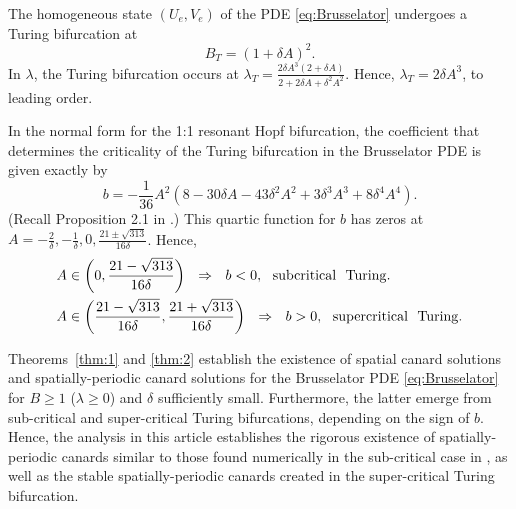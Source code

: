 \documentclass[11pt]{article}
\numberwithin{equation}{section}
\begin{document}
The homogeneous state $(U_e,V_e)$ of the PDE \eqref{eq:Brusselator} undergoes a Turing bifurcation at 
\begin{equation}\label{eq:Brusselator-BT}
B_T = ( 1 + \delta A )^2.
\end{equation}
In $\lambda$, the Turing bifurcation occurs
at $\lambda_T=\frac{2\delta A^3 (2 + \delta A)}{2 + 2 \delta A + \delta^2 A^2}$.
Hence, $\lambda_T = 2 \delta A^3$, to leading order.

In the normal form for the 1:1 resonant Hopf bifurcation,
the coefficient that determines the criticality of the Turing bifurcation in the Brusselator PDE is given exactly by
\begin{equation}
  b = -\frac{1}{36} A^2 \left( 8 - 30 \delta A - 43 
  \delta^2 A^2 + 3 \delta^3 A^3 + 8 \delta^4 A^4 \right).  
\end{equation}
(Recall Proposition 2.1 in \cite{JDKV2026}.)
This quartic function for $b$ has zeros at $A= -\frac{2}{\delta}, -\frac{1}{\delta}, 0, \frac{21 \pm \sqrt{313}}{16\delta}$.
Hence, 
\begin{equation}
    \begin{split}
  A &\in \left(0, \frac{21-\sqrt{313}}{16\delta}\right) \ \ \Rightarrow
  \ \ b < 0, \ \ {\rm subcritical} \ \ {\rm Turing}.  \\
  A &\in \left( \frac{21-\sqrt{313}}{16\delta}, \frac{21 + \sqrt{313}}{16\delta}  \right)
  \ \ \Rightarrow
  \ \ b > 0, \ \ {\rm supercritical} \ \ {\rm Turing}.
    \end{split}
\end{equation}


Theorems~\ref{thm:1} and \ref{thm:2} establish the existence of spatial canard solutions and spatially-periodic canard solutions for the Brusselator PDE \eqref{eq:Brusselator} for $B\ge 1$ ($\lambda\ge 0$) and $\delta$ sufficiently small. 
Furthermore, the latter emerge from sub-critical and super-critical Turing bifurcations, depending on the sign of $b$.
Hence, the analysis in this article establishes the rigorous existence of
spatially-periodic canards similar to those found numerically in the sub-critical case in \cite{JDKV2026}, as well as the stable spatially-periodic canards created in the super-critical Turing bifurcation.
\end{document}
